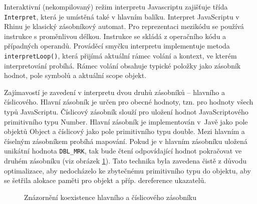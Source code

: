Interaktivní (nekompilovaný) režim interpretu Javascriptu zajišťuje třída \texttt{Interpret}, která je umístěná také v hlavním balíku. Interpret JavaScriptu v Rhinu je klasický zásobníkový automat. Pro reprezentaci mezikódu se používá instrukce s proměnlivou délkou. Instrukce se skládá z operačního kódu a případných operandů. Prováděcí smyčku interpretu implementuje metoda \texttt{interpretLoop()}, která přijímá aktuální rámec volání a kontext, ve kterém interpretování probíhá. Rámec volání obsahuje typické položky jako zásobník hodnot, pole symbolů a aktuální scope objekt.

Zajímavostí je zavedení v interpretu dvou druhů zásobníků -- hlavního a číslicového. Hlavní zásobník je určen pro obecné hodnoty, tzn. pro hodnoty všech typů JavaScriptu. Číslicový zásobník slouží pro uložení hodnot JavaScriptového primitivního typu Number. Hlavní zásobník je implementován v~Javě jako pole objektů Object a číslicový jako pole primitivního typu double. Mezi hlavním a číselným zásobníkem probíhá mapování. Pokud je v hlavním zásobníku uložená unikátní hodnota \texttt{DBL\_MRK}, tak bude čtení odpovídající hodnot pokračovat ve druhém zásobníku (viz obrázek \ref{Figure.RhinoStack}). Tato technika byla zavedena čistě z důvodu optimalizace, aby nedocházelo ke zbytečnému  primitivního typu do objektu, aby se šetřila alokace paměti pro objekt a příp. dereference ukazatelů.

\begin{figure}[H]
  \begin{center}
    \caption{Znázornění koexistence hlavního a číslicového zásobníku}
    \label{Figure.RhinoStack}
  \end{center}
\end{figure}

